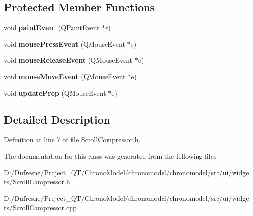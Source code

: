 \subsection*{Protected Member Functions}
\begin{DoxyCompactItemize}
\item 
\hypertarget{class_scroll_compressor_ace8ba0c218c39bdd02ddbf96aee6d603}{void {\bfseries paint\-Event} (Q\-Paint\-Event $\ast$e)}\label{class_scroll_compressor_ace8ba0c218c39bdd02ddbf96aee6d603}

\item 
\hypertarget{class_scroll_compressor_a65a898a2c29a69b86bc3d2edf0b4f4cc}{void {\bfseries mouse\-Press\-Event} (Q\-Mouse\-Event $\ast$e)}\label{class_scroll_compressor_a65a898a2c29a69b86bc3d2edf0b4f4cc}

\item 
\hypertarget{class_scroll_compressor_af9d619502daec26ec170fe0df2a6ca4e}{void {\bfseries mouse\-Release\-Event} (Q\-Mouse\-Event $\ast$e)}\label{class_scroll_compressor_af9d619502daec26ec170fe0df2a6ca4e}

\item 
\hypertarget{class_scroll_compressor_a2b421e2837134f21954a7d25dfb59e6e}{void {\bfseries mouse\-Move\-Event} (Q\-Mouse\-Event $\ast$e)}\label{class_scroll_compressor_a2b421e2837134f21954a7d25dfb59e6e}

\item 
\hypertarget{class_scroll_compressor_a380b7f43d3fb4ceb2b3c7a59e99f6ce2}{void {\bfseries update\-Prop} (Q\-Mouse\-Event $\ast$e)}\label{class_scroll_compressor_a380b7f43d3fb4ceb2b3c7a59e99f6ce2}

\end{DoxyCompactItemize}


\subsection{Detailed Description}


Definition at line 7 of file Scroll\-Compressor.\-h.



The documentation for this class was generated from the following files\-:\begin{DoxyCompactItemize}
\item 
D\-:/\-Dufresne/\-Project\-\_\-\-Q\-T/\-Chrono\-Model/chronomodel/chronomodel/src/ui/widgets/Scroll\-Compressor.\-h\item 
D\-:/\-Dufresne/\-Project\-\_\-\-Q\-T/\-Chrono\-Model/chronomodel/chronomodel/src/ui/widgets/Scroll\-Compressor.\-cpp\end{DoxyCompactItemize}

